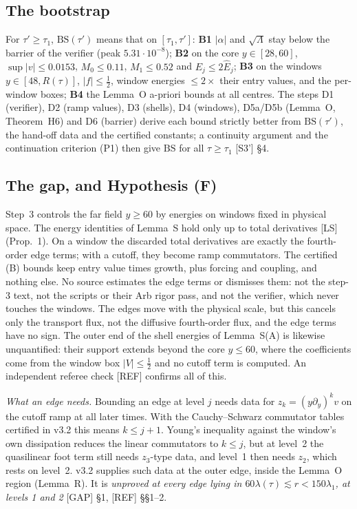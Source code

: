 \documentclass[11pt]{amsart}
\theoremstyle{definition}
\theoremstyle{remark}
\newcommand{\Lam}{\Lambda}
\newcommand{\dref}[1]{[\textsf{#1}]}
\begin{document}
\subsection{The bootstrap}\label{ss:boot}
For $\tau'\ge\tau_1$, $\mathrm{BS}(\tau')$ means that on $[\tau_1,\tau']$: \textbf{B1} $|\alpha|$ and $\sqrt\Lam$ stay below the barrier of the verifier (peak $5.31\cdot10^{-8}$); \textbf{B2} on the core $y\in[28,60]$, $\sup|v|\le0.0153$, $M_0\le0.11$, $M_1\le0.52$ and $E_j\le2\hat E_j$; \textbf{B3} on the windows $y\in[48,R(\tau)]$, $|f|\le\frac12$, window energies $\le2\times$ their entry values, and the per-window boxes; \textbf{B4} the Lemma~O a-priori bounds at all centres. The steps D1 (verifier), D2 (ramp values), D3 (shells), D4 (windows), D5a/D5b (Lemma~O, Theorem~H6) and D6 (barrier) derive each bound strictly better from $\mathrm{BS}(\tau')$, the hand-off data and the certified constants; a continuity argument and the continuation criterion (P1) then give $\mathrm{BS}$ for all $\tau\ge\tau_1$ \dref{S3'} \S4.

\subsection{The gap, and Hypothesis (F)}\label{ss:gap}
Step~3 controls the far field $y\ge60$ by energies on windows fixed in physical space. The energy identities of Lemma~S hold only up to total derivatives \dref{LS} (Prop.~1). On a window the discarded total derivatives are exactly the fourth-order edge terms; with a cutoff, they become ramp commutators. The certified (B) bounds keep entry value times growth, plus forcing and coupling, and nothing else. No source estimates the edge terms or dismisses them: not the step-3 text, not the scripts or their Arb rigor pass, and not the verifier, which never touches the windows. The edges move with the physical scale, but this cancels only the transport flux, not the diffusive fourth-order flux, and the edge terms have no sign. The outer end of the shell energies of Lemma~S(A) is likewise unquantified: their support extends beyond the core $y\le60$, where the coefficients come from the window box $|V|\le\frac12$ and no cutoff term is computed. An independent referee check \dref{REF} confirms all of this.

\emph{What an edge needs.} Bounding an edge at level $j$ needs data for $z_k=(y\partial_y)^kv$ on the cutoff ramp at all later times. With the Cauchy--Schwarz commutator tables certified in v3.2 this means $k\le j+1$. Young's inequality against the window's own dissipation reduces the linear commutators to $k\le j$, but at level~2 the quasilinear foot term still needs $z_3$-type data, and level~1 then needs $z_2$, which rests on level~2. v3.2 supplies such data at the outer edge, inside the Lemma~O region (Lemma~R). It is \emph{unproved at every edge lying in $60\lambda(\tau)\lesssim r<150\lambda_1$, at levels 1 and 2} \dref{GAP} \S1, \dref{REF} \S\S1--2.
\end{document}
